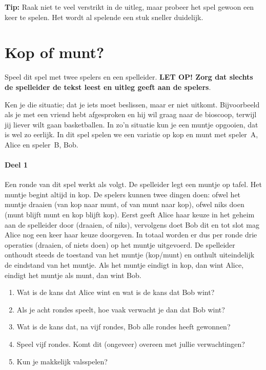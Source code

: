 \documentclass[../../main.tex]{subfiles}
\begin{document}
\textbf{Tip:} Raak niet te veel verstrikt in de uitleg, maar probeer het spel gewoon een keer te spelen. Het wordt al spelende een stuk sneller duidelijk.

\section{Kop of munt?}
Speel dit spel met twee spelers en een spelleider. \textbf{LET OP! Zorg dat slechts de spelleider de tekst leest en uitleg geeft aan de spelers}.

Ken je die situatie; dat je iets moet beslissen, maar er niet uitkomt. Bijvoorbeeld als je met een vriend hebt afgesproken en hij wil graag naar de bioscoop, terwijl jij liever wilt gaan basketballen. In zo'n situatie kun je een muntje opgooien, dat is wel zo eerlijk. In dit spel spelen we een variatie op kop en munt met speler~A, Alice en speler~B, Bob.

\paragraph*{Deel 1}
Een ronde van dit spel werkt als volgt. De spelleider legt een muntje op tafel. Het muntje begint altijd in kop. De spelers kunnen twee dingen doen: ofwel het muntje draaien (van kop naar munt, of van munt naar kop), ofwel niks doen (munt blijft munt en kop blijft kop). Eerst geeft Alice haar keuze in het geheim aan de spelleider door (draaien, of niks), vervolgens doet Bob dit en tot slot mag Alice nog een keer haar keuze doorgeven. In totaal worden er dus per ronde drie operaties (draaien, of niets doen) op het muntje uitgevoerd. De spelleider onthoudt steeds de toestand van het muntje (kop/munt) en onthult uiteindelijk de eindstand van het muntje. Als het muntje eindigt in kop, dan wint Alice, eindigt het muntje als munt, dan wint Bob.
\begin{enumerate}
\item Wat is de kans dat Alice wint en wat is de kans dat Bob wint?
\item Als je acht rondes speelt, hoe vaak verwacht je dan dat Bob wint?
\item Wat is de kans dat, na vijf rondes, Bob alle rondes heeft gewonnen?
\item Speel vijf rondes. Komt dit (ongeveer) overeen met jullie verwachtingen?
\item Kun je makkelijk valsspelen?
\end{enumerate}
\end{document}
